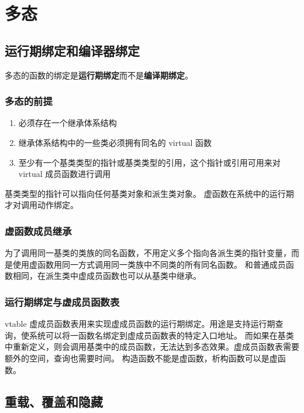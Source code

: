 \chapter{多态}
\newpage

\section{运行期绑定和编译器绑定}

多态的函数的绑定是\textbf{运行期绑定}而不是\textbf{编译期绑定}。

\subsection{多态的前提}

\begin{enumerate}
    \item 必须存在一个继承体系结构
    \item 继承体系结构中的一些类必须拥有同名的 virtual 函数
    \item 至少有一个基类类型的指针或基类类型的引用，这个指针或引用可用来对 virtual 成员函数进行调用
\end{enumerate}

基类类型的指针可以指向任何基类对象和派生类对象。
虚函数在系统中的运行期才对调用动作绑定。

\subsection{虚函数成员继承}

为了调用同一基类的类族的同名函数，不用定义多个指向各派生类的指针变量，而是使用虚函数用同一方式调用同一类族中不同类的所有同名函数。
和普通成员函数相同，在派生类中虚成员函数也可以从基类中继承。

\subsection{运行期绑定与虚成员函数表}

vtable 虚成员函数表用来实现虚成员函数的运行期绑定。用途是支持运行期查询，使系统可以将一函数名绑定到虚成员函数表的特定入口地址。
而如果在基类中重新定义，则会调用基类中的成员函数，无法达到多态效果。虚成员函数表需要额外的空间，查询也需要时间。
构造函数不能是虚函数，析构函数可以是虚函数。

\newpage

\section{重载、覆盖和隐藏}

